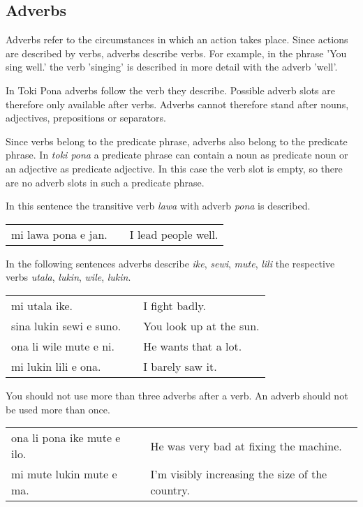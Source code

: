 \newpage
{}
\subsection*{Adverbs}

Adverbs refer to the circumstances in which an action takes place. 
Since actions are described by verbs, adverbs describe verbs. 
For example, in the phrase 'You sing well.' the verb 'singing' is described in more detail with the adverb 'well'. 

In Toki Pona adverbs follow the verb they describe. 
Possible adverb slots are therefore only available after verbs.
Adverbs cannot therefore stand after nouns, adjectives, prepositions or separators. 

Since verbs belong to the predicate phrase, adverbs also belong to the predicate phrase.
In \textit{toki pona} a predicate phrase can contain a noun as predicate noun or an adjective as predicate adjective. 
In this case the verb slot is empty, so there are no adverb slots in such a predicate phrase. 

In this sentence the transitive verb \textit{lawa} with adverb \textit{pona} is described. 

\begin{supertabular}{p{5,5cm}|ll}
mi lawa pona e jan. && I lead people well. \\
\end{supertabular} 

In the following sentences adverbs describe \textit{ike}, \textit{sewi}, \textit{mute}, \textit{lili} the respective verbs \textit{utala}, \textit{lukin}, \textit{wile}, \textit{lukin}.

\begin{supertabular}{p{5,5cm}|ll}
mi utala ike. && I fight badly. \\
sina lukin sewi e suno. && You look up at the sun. \\
ona li wile mute e ni. && He wants that a lot. \\
mi lukin lili e ona. && I barely saw it. \\
\end{supertabular} 

You should not use more than three adverbs after a verb. 
An adverb should not be used more than once. 

\begin{supertabular}{p{5,5cm}|ll}
ona li pona ike mute e ilo. && He was very bad at fixing the machine. \\
mi mute lukin mute e ma. && I'm visibly increasing the size of the country. \\
\end{supertabular}

